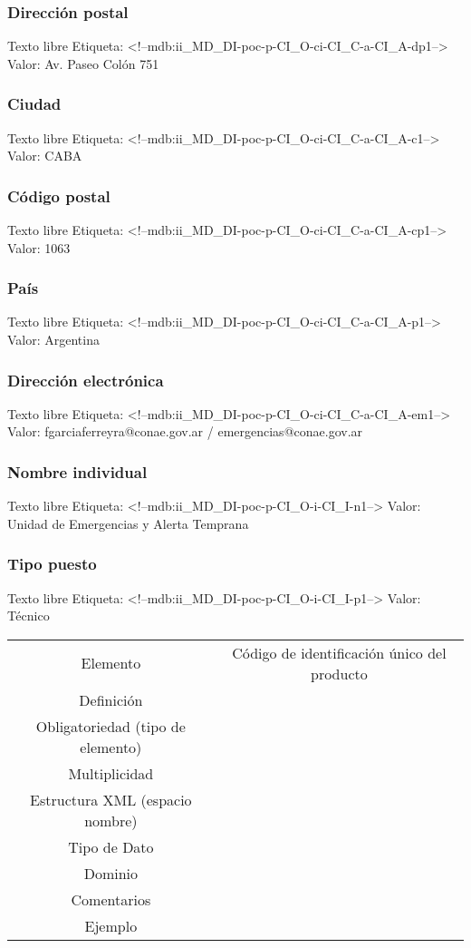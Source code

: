 \documentclass{GVT_CONAE_Class}
\begin{document}
\subsubsection{Dirección postal}
Texto libre
Etiqueta: <!--mdb:ii\_MD\_DI-poc-p-CI\_O-ci-CI\_C-a-CI\_A-dp1-->
Valor: Av. Paseo Colón 751

\subsubsection{Ciudad}
Texto libre
Etiqueta: <!--mdb:ii\_MD\_DI-poc-p-CI\_O-ci-CI\_C-a-CI\_A-c1-->
Valor: CABA

\subsubsection{Código postal}
Texto libre
Etiqueta: <!--mdb:ii\_MD\_DI-poc-p-CI\_O-ci-CI\_C-a-CI\_A-cp1-->
Valor: 1063

\subsubsection{País}
Texto libre
Etiqueta: <!--mdb:ii\_MD\_DI-poc-p-CI\_O-ci-CI\_C-a-CI\_A-p1-->
Valor: Argentina

\subsubsection{Dirección electrónica}
Texto libre
Etiqueta: <!--mdb:ii\_MD\_DI-poc-p-CI\_O-ci-CI\_C-a-CI\_A-em1-->
Valor: fgarciaferreyra@conae.gov.ar / emergencias@conae.gov.ar 

\subsubsection{Nombre individual}
Texto libre
Etiqueta: <!--mdb:ii\_MD\_DI-poc-p-CI\_O-i-CI\_I-n1-->
Valor: Unidad de Emergencias y Alerta Temprana

\subsubsection{Tipo puesto}
Texto libre
Etiqueta: <!--mdb:ii\_MD\_DI-poc-p-CI\_O-i-CI\_I-p1-->
Valor: Técnico

\begin{tabular}{c|c}
    Elemento & Código de identificación único del producto \\
    Definición & \\
    Obligatoriedad (tipo de elemento) & \\
    Multiplicidad & \\
    Estructura XML (espacio nombre) & \\
    Tipo de Dato & \\
    Dominio & \\
    Comentarios & \\
    Ejemplo & \\
\end{tabular}
\end{document}
